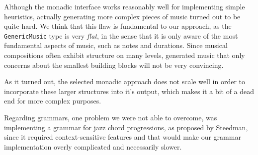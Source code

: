 \documentclass[11pt,a4paper]{article}
\newcommand{\icode}[1]{\texttt{#1}}
\begin{document}
Although the monadic interface works reasonably well for implementing simple heuristics, actually generating more complex pieces of music turned out to be quite hard. We think that this flaw is fundamental to our approach, as the \icode{GenericMusic} type is very \emph{flat}, in the sense that it is only aware of the most fundamental aspects of music, such as notes and durations. Since musical compositions often exhibit structure on many levels, generated music that only concerns about the smallest building blocks will not be very convincing.

As it turned out, the selected monadic approach does not scale well in order to incorporate these larger structures into it's output, which makes it a bit of a dead end for more complex purposes.

Regarding grammars, one problem we were not able to overcome, was implementing a grammar for jazz chord progressions, as proposed by Steedman\cite{jazzchords}, since it required context-sensitive features and that would make our grammar implementation overly complicated and necessarily slower.\\



\end{document}
